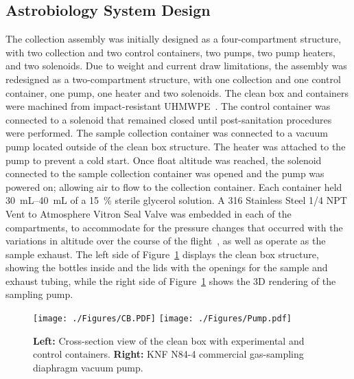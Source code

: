 \subsection{Astrobiology System Design}
\label{sec:Astrobiology Design}


The collection assembly was initially designed as a four-compartment structure, with two collection and two control containers, two pumps, two pump heaters, and two solenoids. Due to weight and current draw  limitations, the assembly was redesigned as a two-compartment structure, with one collection and one control container,  one pump, one heater and two solenoids. The clean box and containers were machined from impact-resistant UHMWPE~\cite{cleanbox}. The control container was connected to a solenoid that remained closed until post-sanitation procedures were performed. The sample collection container was connected to a vacuum pump located outside of the clean box structure. The heater was attached to the pump to prevent a cold start. Once float altitude was reached, the solenoid connected to the sample collection container was opened and the pump was powered on; allowing air to flow to the collection container. Each container held \SIrange{30}{40}{\milli\liter} of a \SI{15}{\%} sterile glycerol solution. A 316 Stainless Steel \SI{1/4}{\inch} NPT Vent to Atmosphere Vitron Seal Valve was embedded in each of the compartments, to accommodate for the pressure changes that occurred with the variations in altitude over the course of the flight~\cite{valve}, as well as operate as the sample exhaust.  The left side of Figure~\ref{fig:pump} displays the clean box structure, showing the bottles inside and the lids with the openings for the sample and exhaust tubing, while the right side of Figure~\ref{fig:pump} shows the 3D rendering of the sampling pump. 


\begin{figure}[H] 
\begin{center}
\texttt{[image: ./Figures/CB.PDF]}
\texttt{[image: ./Figures/Pump.pdf]}
\caption{{\bf Left:} Cross-section view of the clean box with experimental and control containers. {\bf Right:} KNF N84-4 commercial gas-sampling diaphragm vacuum pump.}
\label{fig:pump}
\end{center}
\end{figure} 
